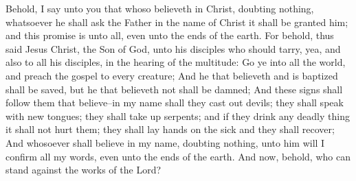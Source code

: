 Behold, I say unto you that whoso believeth in Christ, doubting nothing, whatsoever he shall ask the Father in the name of Christ it shall be granted him; and this promise is unto all, even unto the ends of the earth.
\bverse \iffalse For behold, thus said Jesus Christ, the Son of God, unto his disciples who should tarry, yea, and also to all his disciples, in the hearing of the multitude: Go ye into all the world, and preach the gospel to every creature; \fi
For behold, thus said Jesus Christ, the Son of God, unto his disciples who should tarry, yea, and also to all his disciples, in the hearing of the multitude: Go ye into all the world, and preach the gospel to every creature;
\bverse \iffalse And he that believeth and is baptized shall be saved, but he that believeth not shall be damned; \fi
And he that believeth and is baptized shall be saved, but he that believeth not shall be damned;
\bverse \iffalse And these signs shall follow them that believe--in my name shall they cast out devils; they shall speak with new tongues; they shall take up serpents; and if they drink any deadly thing it shall not hurt them; they shall lay hands on the sick and they shall recover; \fi
And these signs shall follow them that believe--in my name shall they cast out devils; they shall speak with new tongues; they shall take up serpents; and if they drink any deadly thing it shall not hurt them; they shall lay hands on the sick and they shall recover;
\bverse \iffalse And whosoever shall believe in my name, doubting nothing, unto him will I confirm all my words, even unto the ends of the earth. \fi
And whosoever shall believe in my name, doubting nothing, unto him will I confirm all my words, even unto the ends of the earth.
\bverse \iffalse And now, behold, who can stand against the works of the Lord? \fi
And now, behold, who can stand against the works of the Lord?

